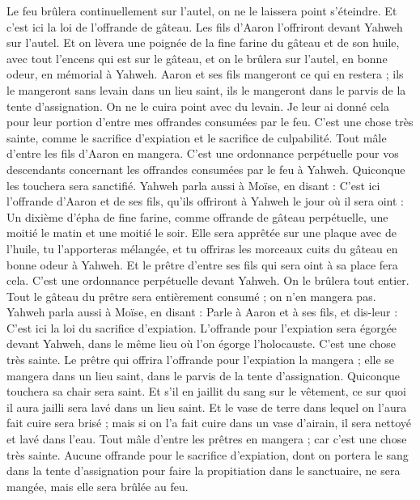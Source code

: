 \begin{multicols}{2}
Le feu brûlera continuellement sur l'autel, on ne le laissera point s'éteindre.
Et c'est ici la loi de l'offrande de gâteau. Les fils d'Aaron l'offriront devant Yahweh sur l'autel.
Et on lèvera une poignée de la fine farine du gâteau et de son huile, avec tout l'encens qui est sur le gâteau, et on le brûlera sur l'autel, en bonne odeur, en mémorial à Yahweh.
Aaron et ses fils mangeront ce qui en restera ; ils le mangeront sans levain dans un lieu saint, ils le mangeront dans le parvis de la tente d'assignation.
On ne le cuira point avec du levain. Je leur ai donné cela pour leur portion d'entre mes offrandes consumées par le feu. C'est une chose très sainte, comme le sacrifice d'expiation et le sacrifice de culpabilité.
Tout mâle d'entre les fils d'Aaron en mangera. C'est une ordonnance perpétuelle pour vos descendants concernant les offrandes consumées par le feu à Yahweh. Quiconque les touchera sera sanctifié.
Yahweh parla aussi à Moïse, en disant :
C'est ici l'offrande d'Aaron et de ses fils, qu'ils offriront à Yahweh le jour où il sera oint : Un dixième d'épha de fine farine, comme offrande de gâteau perpétuelle, une moitié le matin et une moitié le soir.
Elle sera apprêtée sur une plaque avec de l'huile, tu l'apporteras mélangée, et tu offriras les morceaux cuits du gâteau en bonne odeur à Yahweh.
Et le prêtre d'entre ses fils qui sera oint à sa place fera cela. C'est une ordonnance perpétuelle devant Yahweh. On le brûlera tout entier.
Tout le gâteau du prêtre sera entièrement consumé ; on n'en mangera pas.
Yahweh parla aussi à Moïse, en disant :
Parle à Aaron et à ses fils, et dis-leur : C'est ici la loi du sacrifice d'expiation. L'offrande pour l'expiation sera égorgée devant Yahweh, dans le même lieu où l'on égorge l'holocauste. C'est une chose très sainte.
Le prêtre qui offrira l'offrande pour l'expiation la mangera ; elle se mangera dans un lieu saint, dans le parvis de la tente d'assignation.
Quiconque touchera sa chair sera saint. Et s'il en jaillit du sang sur le vêtement, ce sur quoi il aura jailli sera lavé dans un lieu saint.
Et le vase de terre dans lequel on l'aura fait cuire sera brisé ; mais si on l'a fait cuire dans un vase d'airain, il sera nettoyé et lavé dans l'eau.
Tout mâle d'entre les prêtres en mangera ; car c'est une chose très sainte.
Aucune offrande pour le sacrifice d'expiation, dont on portera le sang dans la tente d'assignation pour faire la propitiation dans le sanctuaire, ne sera mangée, mais elle sera brûlée au feu.

\end{multicols}
